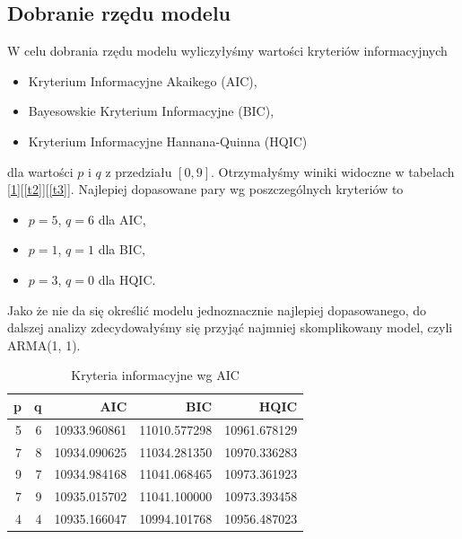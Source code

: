 \documentclass{article}
\theoremstyle{break}
\begin{document}
\subsection{Dobranie rzędu modelu}
W celu dobrania rzędu modelu wyliczyłyśmy wartości kryteriów informacyjnych
\begin{itemize}
	\item Kryterium Informacyjne Akaikego (AIC),
	\item Bayesowskie Kryterium Informacyjne (BIC),
	\item Kryterium Informacyjne Hannana-Quinna (HQIC)
\end{itemize}

dla wartości $p$ i $q$ z przedziału $[0,9]$. Otrzymałyśmy winiki widoczne w tabelach [\ref{t1}][\ref{t2}][\ref{t3}]. Najlepiej dopasowane pary wg poszczególnych kryteriów to

\begin{itemize}
	\item $p=5$, $q=6$ dla AIC,
	\item $p=1$, $q=1$ dla BIC,
	\item $p=3$, $q=0$ dla HQIC.
\end{itemize}

Jako że nie da się określić modelu jednoznacznie najlepiej dopasowanego, do dalszej analizy zdecydowałyśmy się przyjąć najmniej skomplikowany model, czyli ARMA(1, 1).

\begin{table}[H]
	\centering
	\begin{tabular}{|r|r|r|r|r|}
		\hline
		\rowcolor[HTML]{C0C0C0} 
		{\color[HTML]{343434} \textbf{p}} & {\color[HTML]{343434} \textbf{q}} & {\color[HTML]{343434} \textbf{AIC}} & {\color[HTML]{343434} \textbf{BIC}} & {\color[HTML]{343434} \textbf{HQIC}} \\ \hline
		{\color[HTML]{343434} 5}          & {\color[HTML]{343434} 6}          & {\color[HTML]{343434} 10933.960861} & {\color[HTML]{343434} 11010.577298} & {\color[HTML]{343434} 10961.678129}  \\ \hline
		{\color[HTML]{343434} 7}          & {\color[HTML]{343434} 8}          & {\color[HTML]{343434} 10934.090625} & {\color[HTML]{343434} 11034.281350} & {\color[HTML]{343434} 10970.336283}  \\ \hline
		{\color[HTML]{343434} 9}          & {\color[HTML]{343434} 7}          & {\color[HTML]{343434} 10934.984168} & {\color[HTML]{343434} 11041.068465} & {\color[HTML]{343434} 10973.361923}  \\ \hline
		{\color[HTML]{343434} 7}          & {\color[HTML]{343434} 9}          & {\color[HTML]{343434} 10935.015702} & {\color[HTML]{343434} 11041.100000} & {\color[HTML]{343434} 10973.393458}  \\ \hline
		{\color[HTML]{343434} 4}          & {\color[HTML]{343434} 4}          & {\color[HTML]{343434} 10935.166047} & {\color[HTML]{343434} 10994.101768} & {\color[HTML]{343434} 10956.487023}  \\ \hline
	\end{tabular}
\caption{Kryteria informacyjne wg AIC}
\label{t1}
\end{table}
\end{document}

